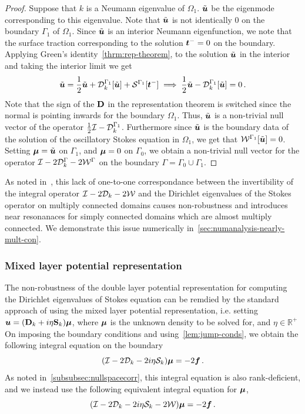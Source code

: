 \begin{proof}
Suppose that $k$ is a Neumann eigenvalue of $\Omega_{1}$. 
$\tilde{{\boldsymbol u}}$ be the eigenmode corresponding to this eigenvalue. 
Note that $\tilde{{\boldsymbol u}}$ is not identically $0$ on the boundary $\Gamma_{1}$
of $\Omega_{1}$.
Since $\tilde{{\boldsymbol u}}$ is an interior Neumann eigenfunction, we note that
the surface traction corresponding to the solution ${\boldsymbol t}^{-} = 0$
on the boundary.
Applying Green's identity~\cref{thrm:rep-theorem}, to the solution 
$\tilde{{\boldsymbol u}}$ in the interior and taking the interior limit we get
\begin{equation}
\tilde{{\boldsymbol u}} = \frac{1}{2}\tilde{{\boldsymbol u}} + {\mathcal D}^{\Gamma_{1}}_{k}[\tilde{{\boldsymbol u}}] +
{\mathcal S}^{\Gamma_{1}} [{\boldsymbol t}^{-}] \implies \frac{1}{2} \tilde{{\boldsymbol u}} - {\mathcal D}^{\Gamma_{1}}_{k}[\tilde{{\boldsymbol u}}]
= 0\, .
\end{equation}
Note that the sign of the ${\bf D}$ in the representation theorem is switched
since the normal is pointing inwards for the boundary $\Omega_{1}$.
Thus, $\tilde{{\boldsymbol u}}$ is a non-trivial null vector of the operator 
$\frac{1}{2}\mathcal I - {\mathcal D}^{\Gamma_{1}}_{k}$. 
Furthermore since $\tilde{{\boldsymbol u}}$ is the boundary data of 
the solution of the oscillatory Stokes equation in $\Omega_{1}$, we
get that ${\mathcal W}^{\Gamma_{1}}[\tilde{{\boldsymbol u}}] = 0$.
Setting ${\boldsymbol \mu} = \tilde{{\boldsymbol u}}$ on $\Gamma_{1}$, and ${\boldsymbol \mu} = 0$ on $\Gamma_{0}$,
we obtain a non-trivial null vector for the operator $\mathcal I - 2{\mathcal D}^{\Gamma}_{k} -2{\mathcal W}^{\Gamma}$
on the boundary $\Gamma = \Gamma_{0} \cup \Gamma_{1}$.
\end{proof}

As noted in~\cite{zhao2015robust}, this lack of one-to-one correspondance between
the invertibility of the integral operator $\mathcal I - 2{\mathcal D}_{k} - 2{\mathcal W}$
and the Dirichlet eigenvalues of the Stokes operator on multiply
connected domains causes non-robustness and introduces near 
resonanaces for simply connected domains
which are almost multiply connected.
We demonstrate this issue numerically in~\cref{sec:numanalysis-nearly-mult-con}.

\subsubsection{Mixed layer potential representation}
\label{subsec:mixedanalysis}
The non-robustness of the double layer potential representation
for computing the Dirichlet eigenvalues of Stokes equation can be remdied
by the standard approach of using the mixed layer potential representation,
i.e. setting
${\boldsymbol u} = ({\bf D}_{k} + i\eta {\bf S}_{k})
{\boldsymbol \mu}$, 
where ${\boldsymbol \mu}$ is the unknown density to be solved for, and $\eta \in \mathbb{R}^{+}$ 
On imposing the boundary conditions and using~\cref{lem:jump-conds}, 
we obtain the following integral equation on the boundary 
\begin{equation}
(\mathcal I - 2{\mathcal D}_{k} - 2i\eta {\mathcal S}_{k}) {\boldsymbol \mu} = -2 {\boldsymbol f} \, . 
\end{equation}
As noted in~\cref{subsubsec:nullspacecorr}, this integral equation 
is also rank-deficient, and we instead use the following 
equivalent integral equation for ${\boldsymbol \mu}$,
\begin{equation}
(\mathcal I - 2{\mathcal D}_{k} -2i\eta {\mathcal S}_{k}  -2{\mathcal W}){\boldsymbol \mu} = -2 {\boldsymbol f} \, .
\end{equation}


